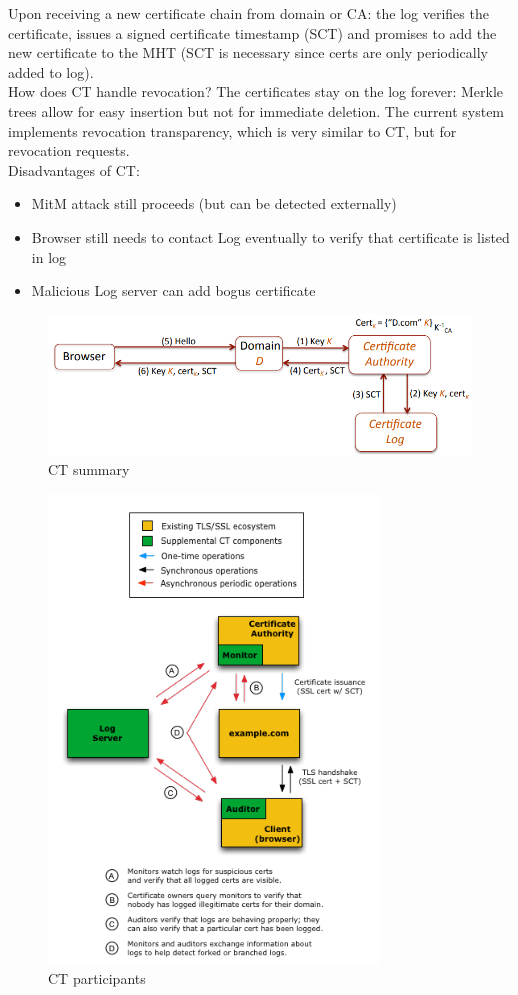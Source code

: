 \documentclass[11pt,oneside,a4paper]{article}
\begin{document}
\newpage

\noindent Upon receiving a new certificate chain from domain or CA: the log verifies the certificate, issues a signed certificate timestamp (SCT) and promises to add the new certificate to the MHT (SCT is necessary since certs are only periodically added to log).\\
How does CT handle revocation? The certificates stay on the log forever: Merkle trees allow for easy insertion but not for immediate deletion. The current system implements revocation transparency, which is very similar to CT, but for revocation requests.\\

\noindent Disadvantages of CT:

\vspace{-\topsep}
\begin{itemize}
	\setlength{\itemsep}{0pt}
	\setlength{\parskip}{0pt}
	\item MitM attack still proceeds (but can be detected externally)
	\item Browser still needs to contact Log eventually to verify that certificate is listed in log
	\item Malicious Log server can add bogus certificate
\end{itemize}
\vspace{-\topsep}

\begin{figure}[hb]
	\centering
	\includegraphics[width=0.6\linewidth]{figures/ct_summary}
	\caption{CT summary}
	\label{fig:ctsummary}
\end{figure}

\begin{figure}[hb]
	\centering
	\includegraphics[width=0.5\linewidth]{figures/ct_participants}
	\caption{CT participants}
	\label{fig:ctparticipants}
\end{figure}
\end{document}
